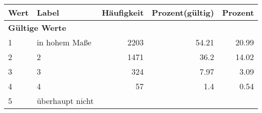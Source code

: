     \begin{longtable}{lXrrr}
     \toprule
     \textbf{Wert} & \textbf{Label} & \textbf{Häufigkeit} & \textbf{Prozent(gültig)} & \textbf{Prozent} \\
     \endhead
     \midrule
     \multicolumn{5}{l}{\textbf{Gültige Werte}}\\

     1 &
     \multicolumn{1}{X}{ in hohem Maße   } &


       \num{2203} &
       \num[round-mode=places,round-precision=2]{54,21} &
         \num[round-mode=places,round-precision=2]{20,99} \\

     2 &
     \multicolumn{1}{X}{ 2   } &


       \num{1471} &
       \num[round-mode=places,round-precision=2]{36,2} &
         \num[round-mode=places,round-precision=2]{14,02} \\

     3 &
     \multicolumn{1}{X}{ 3   } &


       \num{324} &
       \num[round-mode=places,round-precision=2]{7,97} &
         \num[round-mode=places,round-precision=2]{3,09} \\

     4 &
     \multicolumn{1}{X}{ 4   } &


       \num{57} &
       \num[round-mode=places,round-precision=2]{1,4} &
         \num[round-mode=places,round-precision=2]{0,54} \\

     5 &
     \multicolumn{1}{X}{ überhaupt nicht   } &



\end{longtable}
